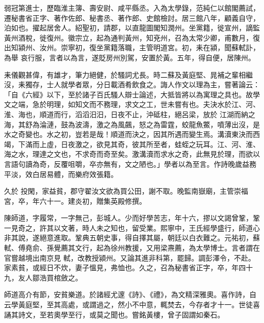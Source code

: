 \begin{pinyinscope}
 弱冠第進士，歷臨淮主簿、壽安尉、咸平縣丞。入為太學錄，范純仁以館閣薦試，遷秘書省正字、著作佐郎、秘書丞、著作郎、史館檢討。居三館八年，顧義自守，泊如也。擢起居舍人。紹聖初，請郡，以直龍圖閣知潤州。坐黨籍，徙宣州，謫監黃州酒稅，徙復州。徽宗立，起為通判黃州，知兗州，召為太常少卿，甫數月，復出知潁州、汝州。崇寧初，復坐黨籍落職，主管明道宮。初，耒在潁，聞蘇軾訃，為舉
 哀行服，言者以為言，遂貶房州別駕，安置於黃。五年，得自便，居陳州。



 耒儀觀甚偉，有雄才，筆力絕健，於騷詞尤長。時二蘇及黃庭堅、晁補之輩相繼沒，耒獨存，士人就學者眾，分日載酒肴飲食之。誨人作文以理為主，嘗著論云：「自《六經》以下，至於諸子百氏騷人辯士論述，大抵皆將以為寓理之具也。故學文之端，急於明理，如知文而不務理，求文之工，世未嘗有也。夫決水於江、河、淮、海也，順道而行，滔滔汨汨，日夜不止，沖砥柱，絕呂梁，放於
 江湖而納之海，其舒為淪漣，鼓為波濤，激之為風飆，怒之為雷霆，蛟龍魚鱉，噴薄出沒，是水之奇變也。水之初，豈若是哉！順道而決之，因其所遇而變生焉。溝瀆東決而西竭，下滿而上虛，日夜激之，欲見其奇，彼其所至者，蛙蛭之玩耳。江、河、淮、海之水，理達之文也，不求奇而奇至矣。激溝瀆而求水之奇，此無見於理，而欲以言語句讀為奇，反覆咀嚼，卒亦無有，文之陋也。」學者以為至言。作詩晚歲益務平淡，效白居易體，而樂府效張籍。



 久於
 投閑，家益貧，郡守翟汝文欲為買公田，謝不取。晚監南嶽廟，主管崇福宮，卒，年六十一。建炎初，贈集英殿修撰。



 陳師道，字履常，一字無己，彭城人。少而好學苦志，年十六，摎以文謁曾鞏，鞏一見奇之，許其以文著，時人未之知也，留受業。熙寧中，王氏經學盛行，師道心非其說，遂絕意進取。鞏典五朝史事，得自擇其屬，朝廷以白衣難之。元祐初，蘇軾、傅堯俞、孫覺薦其文行，起為徐州教援，又用梁燾薦，為太學博士。言者謂在官嘗越境出南京見
 軾，改教授潁州。又論其進非科第，罷歸。調彭澤令，不赴。家素貧，或經日不炊，妻子慍見，弗恤也。久之，召為秘書省正字，卒，年四十九，友人鄒浩買棺斂之。



 師道高介有節，安貧樂道。於諸經尤邃《詩》、《禮》，為文精深雅奧。喜作詩，自云學黃庭堅，至其高處，或謂過之，然小不中意，輒焚去，今存者才十一。世徒喜誦其詩文，至若奧學至行，或莫之聞也。嘗銘黃樓，曾子固謂如秦石。




\end{pinyinscope}
